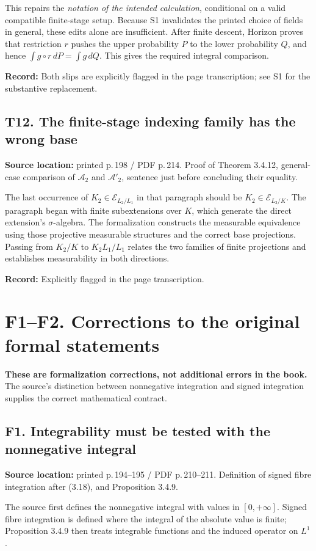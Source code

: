 \documentclass[10pt,a4paper]{article}
\newcommand{\loc}[2]{\textbf{Source location:} printed p.\,#1 / PDF p.\,#2.}
\newcommand{\hist}[1]{\par{\footnotesize\color{graytext}\textbf{Record:} #1}}
\newcommand{\A}{\mathcal A}
\newcommand{\E}{\mathscr E}
\begin{document}
This repairs the \emph{notation of the intended calculation}, conditional
on a valid compatible finite-stage setup. Because S1 invalidates the
printed choice of fields in general, these edits alone are insufficient.
After finite descent, Horizon proves that restriction $r$ pushes the
upper probability $P$ to the lower probability $Q$, and hence
$\int g\circ r\,dP=\int g\,dQ$. This gives the required integral comparison.
\hist{Both slips are explicitly flagged in the page transcription; see S1 for the
substantive replacement.}

\subsection{T12. The finite-stage indexing family has the wrong base}
\loc{198}{214} Proof of Theorem 3.4.12, general-case comparison of
$\A_2$ and $\A'_2$, sentence just before concluding their equality.

The last occurrence of $K_2\in\E_{L_2/L_1}$ in that paragraph should
be \textbf{$K_2\in\E_{L_2/K}$}. The paragraph began with finite
subextensions over $K$, which generate the direct extension's
$\sigma$-algebra. The formalization constructs the measurable equivalence using
those projective measurable structures and the correct base projections.
Passing from $K_2/K$ to $K_2L_1/L_1$ relates the two families of finite
projections and establishes measurability in both directions.
\hist{Explicitly flagged in the page transcription.}

\newpage
\section{F1--F2. Corrections to the original formal statements}\label{f1}
\textbf{These are formalization corrections, not additional errors in the
book.} The source's distinction between nonnegative integration and
signed integration supplies the correct mathematical contract.

\subsection{F1. Integrability must be tested with the nonnegative integral}
\loc{194--195}{210--211} Definition of signed fibre integration after
(3.18), and Proposition 3.4.9.

The source first defines the nonnegative integral with values in
$[0,+\infty]$. Signed fibre integration is defined where the integral
of the absolute value is finite; Proposition 3.4.9 then treats integrable
functions and the induced operator on $L^1$.
\end{document}
